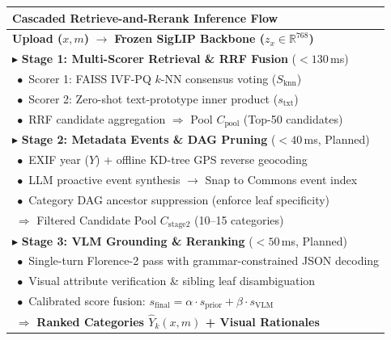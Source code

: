 \documentclass[10pt,a4paper,twocolumn]{article}
\begin{document}
\begin{center}
\footnotesize
\begin{tabularx}{\columnwidth}{|X|}
\hline
\textbf{Cascaded Retrieve-and-Rerank Inference Flow} \\
\hline
\textbf{Upload ($x, m$)} $\longrightarrow$ \textbf{Frozen SigLIP Backbone ($z_x \in \mathbb{R}^{768}$)} \\
$\blacktriangleright$ \textbf{Stage 1: Multi-Scorer Retrieval \& RRF Fusion} ($<130$\,ms) \\
$\;\bullet$ Scorer 1: FAISS IVF-PQ $k$-NN consensus voting ($S_{\text{knn}}$) \\
$\;\bullet$ Scorer 2: Zero-shot text-prototype inner product ($s_{\text{txt}}$) \\
$\;\bullet$ RRF candidate aggregation $\Longrightarrow$ Pool $C_{\text{pool}}$ (Top-50 candidates) \\
\hline
$\blacktriangleright$ \textbf{Stage 2: Metadata Events \& DAG Pruning} ($<40$\,ms, Planned) \\
$\;\bullet$ EXIF year ($Y$) + offline KD-tree GPS reverse geocoding \\
$\;\bullet$ LLM proactive event synthesis $\to$ Snap to Commons event index \\
$\;\bullet$ Category DAG ancestor suppression (enforce leaf specificity) \\
$\;\Longrightarrow$ Filtered Candidate Pool $C_{\text{stage2}}$ (10--15 categories) \\
\hline
$\blacktriangleright$ \textbf{Stage 3: VLM Grounding \& Reranking} ($<50$\,ms, Planned) \\
$\;\bullet$ Single-turn Florence-2 pass with grammar-constrained JSON decoding \\
$\;\bullet$ Visual attribute verification \& sibling leaf disambiguation \\
$\;\bullet$ Calibrated score fusion: $s_{\text{final}} = \alpha \cdot s_{\text{prior}} + \beta \cdot s_{\text{VLM}}$ \\
$\;\Longrightarrow$ \textbf{Ranked Categories $\hat{Y}_k(x,m)$ + Visual Rationales} \\
\hline
\end{tabularx}
\end{center}
\end{document}
